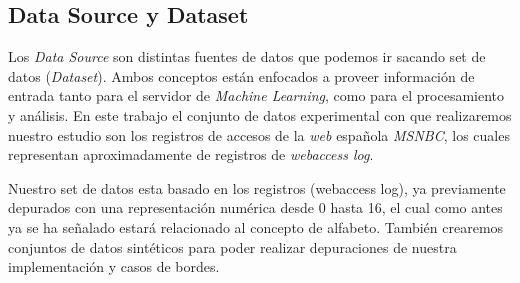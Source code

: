\subsection{Data Source y Dataset }

	Los \emph{Data Source} son distintas fuentes de datos que podemos ir sacando set de datos (\emph{Dataset}). Ambos conceptos están enfocados a proveer información de entrada tanto para el servidor de \emph{Machine Learning}, como para el procesamiento y análisis.
	En este trabajo el conjunto de datos experimental con que realizaremos nuestro estudio son los registros de accesos de la \emph{web} española \emph{MSNBC}\cite{Claude2014}, los cuales representan aproximadamente de registros de \emph{webaccess log}.

	Nuestro set de  datos esta basado en los registros (webaccess log), ya previamente depurados con una representación numérica desde 0 hasta 16, el cual como antes ya se ha señalado estará relacionado al concepto de alfabeto. También crearemos conjuntos de datos sintéticos para poder realizar depuraciones de nuestra implementación y casos de bordes.
	
	 



 















